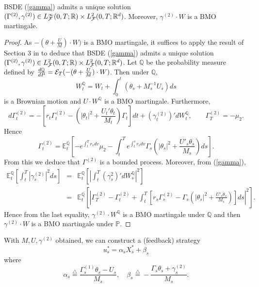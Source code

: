 \documentclass[final]{siamltex}
\begin{document}
\begin{proposition}
 BSDE (\ref{gamma}) admits a unique solution $(\Gamma^{(2)},\gamma^{(2)})\in L^\infty_{{\cal F}}(0,T;\mathbb R)\times
L^2_{{\cal F}}(0,T;\mathbb R^d)$. Moreover, $\gamma^{(2)}\cdot W$ is a BMO martingale.
\end{proposition}
\begin{proof}
As $-(\theta+\frac{U}{M})\cdot W)$ is a BMO martingale, it
suffices to apply the result of Section 3 in \cite{BC} to deduce
that BSDE (\ref{gamma}) admits a unique solution
$(\Gamma^{(2)},\gamma^{(2)})\in L^2_{{\cal F}}(0,T;{\mathbb{R}})\times L^2_{{\cal F}}(0,T;{\mathbb{R}}^d)$. Let ${\mathbb{Q}}$ be the
probability measure defined by $\frac{d{\mathbb{Q}}}{dP}={\cal
E}_T(-(\theta+\frac{U}{M})\cdot W)$. Then under ${\mathbb{Q}}$,
$$W^{\mathbb{Q}}_t=W_t+\int_0^t (\theta_s+M_s^{-1}U_s)ds$$
is a Brownian motion and $U\cdot W^{\mathbb{Q}}$ is a BMO martingale.
Furthermore,
$$d\Gamma^{(2)}_t=-\left[r_t\Gamma^{(2)}_t-\left(|\theta_t|^2+\frac{U_t'\theta_t}{M_t}\right)\Gamma_t\right]dt+(\gamma_t^{(2)})'
dW^{\mathbb{Q}}_t,\qquad \Gamma^{(2)}_T=-\mu_2.$$
Hence
$$\Gamma^{(2)}_t=\mathbb E^{\mathbb{Q}}_t\left[-e^{\int_t^T r_vdv}\mu_2-\int_t^T e^{\int_t^s r_vdv}\Gamma_s\left(|\theta_s|^2+\frac{U'_s\theta_s}{M_s}\right)ds\right].$$
From this we deduce that $\Gamma^{(2)}$ is a bounded process. Moreover, from (\ref{gamma}),
\begin{eqnarray*}
 \mathbb E^{\mathbb{Q}}_t\left[\int_t^T |\gamma^{(2)}_s|^2ds\right]&=&\mathbb E^{\mathbb{Q}}_t\left[\left|\int_t^T( \gamma^{2}_s)'dW^{\mathbb{Q}}_s\right|^2\right]\\
&=&\mathbb
E^{\mathbb{Q}}_t\left[\left|\Gamma^{(2)}_T-\Gamma^{(2)}_t+\int_t^T
\left[r_s\Gamma^{(2)}_s-\Gamma_s\left(|\theta_s|^2+\frac{U'_s\theta_s}{M_s}\right)\right]ds\right|^2\right].
\end{eqnarray*}
Hence from the last equality, $\gamma^{(2)}\cdot W^{\mathbb{Q}}$ is a BMO
martingale under ${\mathbb{Q}}$ and then $\gamma^{(2)}\cdot {W}$ is a BMO
martingale under ${\mathbb{P}}$.
\end{proof}

\medskip

With $M, U, \gamma^{(2)}$ obtained, we can construct a  (feedback) strategy
\begin{equation}\label{feed}
u^*_s=\alpha_s X_s^*+\beta_s
\end{equation}
where $$\alpha_s{\stackrel{\triangle}{=}} \frac{\Gamma^{(1)}_s\theta_s-U_s}{M_s},\quad
\beta_s{\stackrel{\triangle}{=}} -\frac{\Gamma_s\theta_s+\gamma^{(2)}_s}{M_s}.$$
\end{document}
